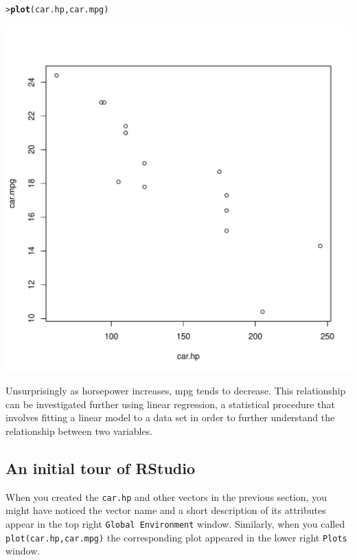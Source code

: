 \documentclass[12pt,oneside]{book}\usepackage[]{graphicx}\usepackage[]{color}
\makeatletter
\def\maxwidth{ %
  \ifdim\Gin@nat@width>\linewidth
    \linewidth
  \else
    \Gin@nat@width
  \fi
}
\newcommand{\hlstd}[1]{\textcolor[rgb]{0.345,0.345,0.345}{#1}}%
\newcommand{\hlkwd}[1]{\textcolor[rgb]{0.737,0.353,0.396}{\textbf{#1}}}%
\newenvironment{kframe}{%
 \def\at@end@of@kframe{}%
 \ifinner\ifhmode%
  \def\at@end@of@kframe{\end{minipage}}%
  \begin{minipage}{\columnwidth}%
 \fi\fi%
 \def\FrameCommand##1{\hskip\@totalleftmargin \hskip-\fboxsep
 \colorbox{shadecolor}{##1}\hskip-\fboxsep
     \hskip-\linewidth \hskip-\@totalleftmargin \hskip\columnwidth}%
 \MakeFramed {\advance\hsize-\width
   \@totalleftmargin\z@ \linewidth\hsize
   \@setminipage}}%
 {\par\unskip\endMakeFramed%
 \at@end@of@kframe}
\newenvironment{knitrout}{}{} %
\makeatother
\begin{document}
\begin{knitrout}
\color{fgcolor}\begin{kframe}
\begin{alltt}
\hlstd{> }\hlkwd{plot}\hlstd{(car.hp, car.mpg)}
\end{alltt}
\end{kframe}
\includegraphics[width=\maxwidth]{figure/unnamed-chunk-18-1} 

\end{knitrout}
Unsurprisingly as horsepower increases, mpg tends to decrease. This relationship can be investigated further using linear regression, a statistical procedure that involves fitting a linear model to a data set in order to further understand the relationship between two variables.

\subsection{An initial tour of RStudio}

When you created the \verb+car.hp+ and other vectors in the previous section, you might have noticed the vector name and a short description of its attributes appear in the top right \verb+Global Environment+ window. Similarly, when you called \verb+plot(car.hp,car.mpg)+ the corresponding plot appeared in the lower right \verb+Plots+ window.  
\end{document}
